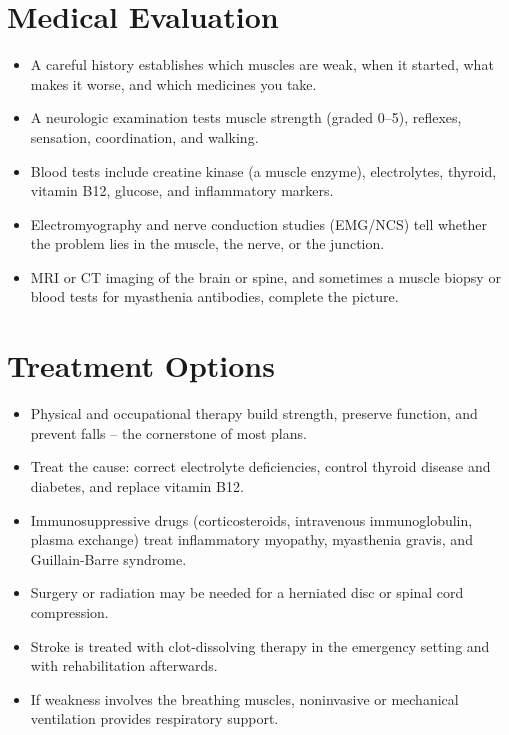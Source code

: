 \section*{Medical Evaluation}
\begin{itemize}
  \item A careful history establishes which muscles are weak, when it started, what makes it worse, and which medicines you take.
  \item A neurologic examination tests muscle strength (graded 0--5), reflexes, sensation, coordination, and walking.
  \item Blood tests include creatine kinase (a muscle enzyme), electrolytes, thyroid, vitamin B12, glucose, and inflammatory markers.
  \item Electromyography and nerve conduction studies (EMG/NCS) tell whether the problem lies in the muscle, the nerve, or the junction.
  \item MRI or CT imaging of the brain or spine, and sometimes a muscle biopsy or blood tests for myasthenia antibodies, complete the picture.
\end{itemize}

\section*{Treatment Options}
\begin{itemize}
  \item Physical and occupational therapy build strength, preserve function, and prevent falls -- the cornerstone of most plans.
  \item Treat the cause: correct electrolyte deficiencies, control thyroid disease and diabetes, and replace vitamin B12.
  \item Immunosuppressive drugs (corticosteroids, intravenous immunoglobulin, plasma exchange) treat inflammatory myopathy, myasthenia gravis, and Guillain-Barre syndrome.
  \item Surgery or radiation may be needed for a herniated disc or spinal cord compression.
  \item Stroke is treated with clot-dissolving therapy in the emergency setting and with rehabilitation afterwards.
  \item If weakness involves the breathing muscles, noninvasive or mechanical ventilation provides respiratory support.
\end{itemize}


